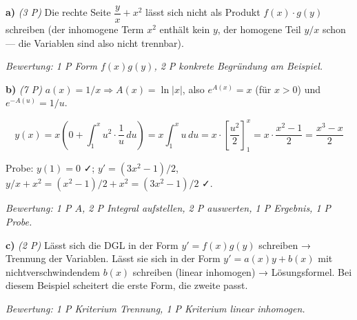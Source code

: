 \documentclass[11pt, a4paper]{article}
\begin{document}
\textbf{a)} \textit{(3 P)} Die rechte Seite $\dfrac{y}{x} + x^2$ lässt sich nicht als Produkt $f(x)\cdot g(y)$ schreiben (der inhomogene Term $x^2$ enthält kein $y$, der homogene Teil $y/x$ schon — die Variablen sind also nicht trennbar).

\textit{Bewertung: 1 P Form $f(x) g(y)$, 2 P konkrete Begründung am Beispiel.}


\textbf{b)} \textit{(7 P)} $a(x) = 1/x \Rightarrow A(x) = \ln|x|$, also $e^{A(x)} = x$ (für $x>0$) und $e^{-A(u)} = 1/u$.

\[
y(x) = x\left(0 + \int_1^x u^2 \cdot \dfrac{1}{u}\,du\right) = x \int_1^x u\,du = x \cdot \left[\dfrac{u^2}{2}\right]_1^x = x \cdot \dfrac{x^2 - 1}{2} = \dfrac{x^3 - x}{2}
\]

Probe: $y(1) = 0$ ✓; $y' = (3x^2 - 1)/2$, $y/x + x^2 = (x^2-1)/2 + x^2 = (3x^2-1)/2$ ✓.

\textit{Bewertung: 1 P $A$, 2 P Integral aufstellen, 2 P auswerten, 1 P Ergebnis, 1 P Probe.}


\textbf{c)} \textit{(2 P)} Lässt sich die DGL in der Form $y' = f(x) g(y)$ schreiben → Trennung der Variablen. Lässt sie sich in der Form $y' = a(x) y + b(x)$ mit nichtverschwindendem $b(x)$ schreiben (linear inhomogen) → Lösungsformel. Bei diesem Beispiel scheitert die erste Form, die zweite passt.

\textit{Bewertung: 1 P Kriterium Trennung, 1 P Kriterium linear inhomogen.}





\end{document}
